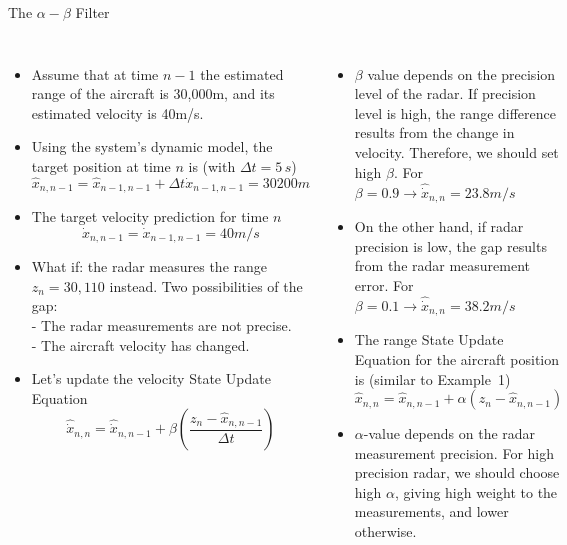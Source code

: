 \begin{frame}{The $\alpha-\beta$ Filter}
\begin{columns}
    \begin{itemize}
        \item Assume that at time $n-1$ the estimated range of the aircraft is 30,000m, and its estimated velocity is 40m/s.
        \item Using the system's dynamic model, the target position at time $n$ is (with $\Delta t = 5\,s$)
        \begin{equation}
          \hat{x}_{n, n-1} = \hat{x}_{n-1,n-1} + \Delta t \dot{x}_{n-1,n-1} = 30200m\nonumber  
        \end{equation}
        \item The target velocity prediction for time $n$
        \begin{equation}
          \dot{x}_{n, n-1} = \dot{x}_{n-1,n-1} = 40m/s\nonumber  
        \end{equation}
        \item What if: the radar measures the range $z_n = 30,110$ instead. Two possibilities of the gap:\\
        - The radar measurements are not precise.\\
        - The aircraft velocity has changed. 
        \item Let's update the velocity State Update Equation
        \begin{equation}
          \boxed{\hat{\dot{x}}_{n, n} = \hat{\dot{x}}_{n,n-1} + \beta \left(\frac{z_n - \hat{x}_{n,n-1}}{\Delta t}\right)\nonumber }
        \end{equation}
    \end{itemize}
    \begin{itemize}
        \item $\beta$ value depends on the precision level of the radar. If precision level is high, the range difference results from the change in velocity. Therefore, we should set high $\beta$. For $\beta=0.9 \rightarrow \hat{\dot{x}}_{n,n}= 23.8 m/s$
        \item On the other hand, if radar precision is low, the gap results from the radar measurement error. For $\beta=0.1 \rightarrow \hat{\dot{x}}_{n,n}= 38.2 m/s$
        
        \item The range State Update Equation for the aircraft position is (similar to Example~1)
        \begin{equation}
          \boxed{\hat{x}_{n, n} = \hat{x}_{n,n-1} + \alpha \left(z_n - \hat{x}_{n,n-1}\right)\nonumber }
        \end{equation}
        \item $\alpha$-value depends on the radar measurement precision. For high precision radar, we should choose high $\alpha$, giving high weight to the measurements, and lower otherwise.
        

\end{itemize}
\end{columns}
\end{frame}
